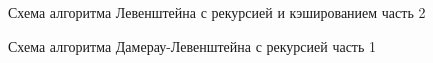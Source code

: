 \begin{figure}
	\caption{Схема алгоритма Левенштейна с рекурсией и кэшированием часть 2}
\end{figure}

\begin{figure}
	\caption{Схема алгоритма Дамерау-Левенштейна с рекурсией часть 1}
\end{figure}

